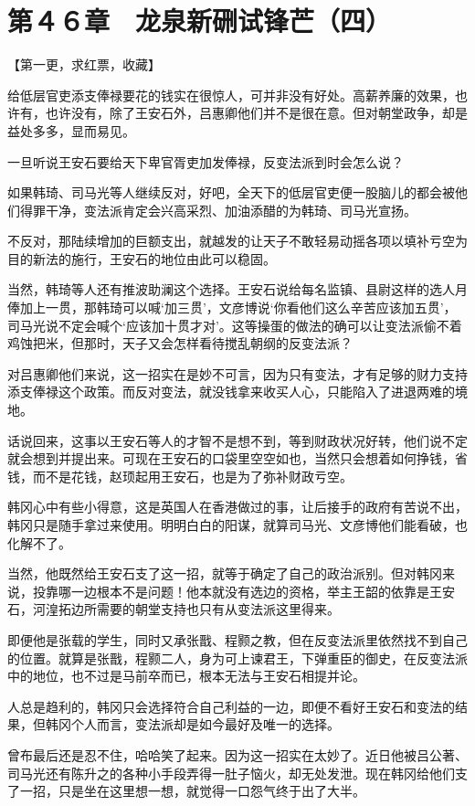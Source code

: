 \section{第４６章　龙泉新硎试锋芒（四）}

【第一更，求红票，收藏】

给低层官吏添支俸禄要花的钱实在很惊人，可并非没有好处。高薪养廉的效果，也许有，也许没有，除了王安石外，吕惠卿他们并不是很在意。但对朝堂政争，却是益处多多，显而易见。

一旦听说王安石要给天下卑官胥吏加发俸禄，反变法派到时会怎么说？

如果韩琦、司马光等人继续反对，好吧，全天下的低层官吏便一股脑儿的都会被他们得罪干净，变法派肯定会兴高采烈、加油添醋的为韩琦、司马光宣扬。

不反对，那陆续增加的巨额支出，就越发的让天子不敢轻易动摇各项以填补亏空为目的新法的施行，王安石的地位由此可以稳固。

当然，韩琦等人还有推波助澜这个选择。王安石说给每名监镇、县尉这样的选人月俸加上一贯，那韩琦可以喊‘加三贯’，文彦博说‘你看他们这么辛苦应该加五贯’，司马光说不定会喊个‘应该加十贯才对’。这等操蛋的做法的确可以让变法派偷不着鸡蚀把米，但那时，天子又会怎样看待搅乱朝纲的反变法派？

对吕惠卿他们来说，这一招实在是妙不可言，因为只有变法，才有足够的财力支持添支俸禄这个政策。而反对变法，就没钱拿来收买人心，只能陷入了进退两难的境地。

话说回来，这事以王安石等人的才智不是想不到，等到财政状况好转，他们说不定就会想到并提出来。可现在王安石的口袋里空空如也，当然只会想着如何挣钱，省钱，而不是花钱，赵顼起用王安石，也是为了弥补财政亏空。

韩冈心中有些小得意，这是英国人在香港做过的事，让后接手的政府有苦说不出，韩冈只是随手拿过来使用。明明白白的阳谋，就算司马光、文彦博他们能看破，也化解不了。

当然，他既然给王安石支了这一招，就等于确定了自己的政治派别。但对韩冈来说，投靠哪一边根本不是问题！他本就没有选边的资格，举主王韶的依靠是王安石，河湟拓边所需要的朝堂支持也只有从变法派这里得来。

即便他是张载的学生，同时又承张戬、程颢之教，但在反变法派里依然找不到自己的位置。就算是张戬，程颢二人，身为可上谏君王，下弹重臣的御史，在反变法派中的地位，也不过是马前卒而已，根本无法与王安石相提并论。

人总是趋利的，韩冈只会选择符合自己利益的一边，即便不看好王安石和变法的结果，但韩冈个人而言，变法派却是如今最好及唯一的选择。

曾布最后还是忍不住，哈哈笑了起来。因为这一招实在太妙了。近日他被吕公著、司马光还有陈升之的各种小手段弄得一肚子恼火，却无处发泄。现在韩冈给他们支了一招，只是坐在这里想一想，就觉得一口怨气终于出了大半。

